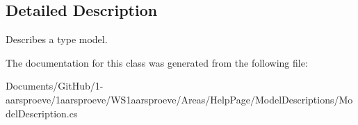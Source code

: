 \subsection{Detailed Description}
Describes a type model. 



The documentation for this class was generated from the following file\+:\begin{DoxyCompactItemize}
\item 
Documents/\+Git\+Hub/1-\/aarsproeve/1aarsproeve/\+W\+S1aarsproeve/\+Areas/\+Help\+Page/\+Model\+Descriptions/Model\+Description.\+cs\end{DoxyCompactItemize}
